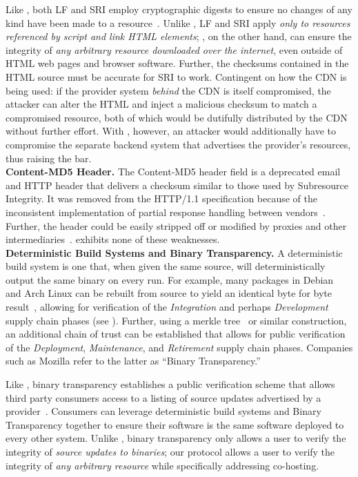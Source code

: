Like \SYSTEM{}, both LF and SRI employ cryptographic digests to ensure no
changes of any kind have been made to a resource~\cite{SRI}. Unlike \SYSTEM{},
LF and SRI apply \emph{only to resources referenced by script and link HTML
elements}; \SYSTEM{}, on the other hand, can ensure the integrity of \emph{any
arbitrary resource downloaded over the internet}, even outside of HTML web pages
and browser software. Further, the checksums contained in the HTML source must
be accurate for SRI to work. Contingent on how the CDN is being used: if the
provider system \emph{behind} the CDN is itself compromised, the attacker can
alter the HTML and inject a malicious checksum to match a compromised resource,
both of which would be dutifully distributed by the CDN without further effort.
With \SYSTEM{}, however, an attacker would additionally have to compromise the
separate backend system that advertises the provider's resources, thus raising
the bar. \\

\noindent\textbf{Content-MD5 Header.} The Content-MD5 header field is a
deprecated email and HTTP header that delivers a checksum similar to those used
by Subresource Integrity. It was removed from the HTTP/1.1 specification because
of the inconsistent implementation of partial response handling between
vendors~\cite{HTTP1.1}. Further, the header could be easily stripped off or
modified by proxies and other intermediaries~\cite{MD5Header}. \SYSTEM{}
exhibits none of these weaknesses. \\

\noindent\textbf{Deterministic Build Systems and Binary Transparency.} A
deterministic build system is one that, when given the same source, will
deterministically output the same binary on every run. For example, many
packages in Debian~\cite{ReproBuildsDebian} and Arch Linux can be rebuilt from
source to yield an identical byte for byte result~\cite{ReproBuilds}, allowing
for verification of the \emph{Integration} and perhaps \emph{Development} supply
chain phases (see ). Further, using a merkle
tree~\cite{MerkleTree} or similar construction, an additional chain of trust can
be established that allows for public verification of the \emph{Deployment},
\emph{Maintenance}, and \emph{Retirement} supply chain phases. Companies such as
Mozilla refer to the latter as ``Binary Transparency.''

Like \SYSTEM{}, binary transparency establishes a public verification scheme
that allows third party consumers access to a listing of source updates
advertised by a provider~\cite{BinaryTransparency}. Consumers can leverage
deterministic build systems and Binary Transparency together to ensure their
software is the same software deployed to every other system. Unlike \SYSTEM{},
binary transparency only allows a user to verify the integrity of \emph{source
updates to binaries}; our protocol allows a user to verify the integrity of
\emph{any arbitrary resource} while specifically addressing co-hosting. \\

